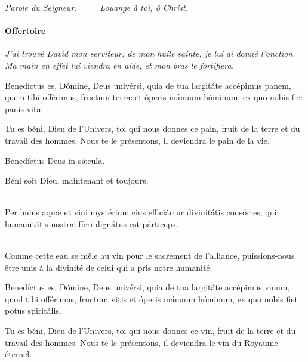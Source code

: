 \documentclass[twoside]{article}
\begin{document}
\emph{\vv Parole du Seigneur. ~~~~ \rr Louange à toi, ô Christ.}

\paragraph{Offertoire}


\emph{J’ai trouvé David mon serviteur: de mon huile sainte, je lui ai donné l’onction. Ma main en effet lui viendra en aide, et mon bras le fortifiera.}

\begin{paracol}{2}
Benedíctus es, Dómine, Deus univérsi,
quia de tua largitáte accépimus panem,
quem tibi offérimus,
fructum terræ et óperis mánuum hóminum:
ex quo nobis fiet panis vitæ. 

\switchcolumn

Tu es béni, Dieu de l'Univers, toi qui nous donnes ce pain, fruit de la terre et du travail des hommes. Nous te le présentons, il deviendra le pain de la vie.

\switchcolumn*

Benedíctus Deus in sǽcula. 

\switchcolumn

Béni soit Dieu, maintenant et toujours.

\switchcolumn*

\\
Per huius aquæ et vini mystérium
eius efficiámur divinitátis consórtes,
qui humanitátis nostræ fíeri dignátus est párticeps.

\switchcolumn

~\\
Comme cette eau se mêle au vin pour le sacrement de l'alliance, 
puissions-nous être unis à la divinité
de celui qui a pris notre humanité.

\switchcolumn*

Benedíctus es, Dómine, Deus univérsi,
quia de tua largitáte accépimus vinum,
quod tibi offérimus,
fructum vitis et óperis mánuum hóminum,
ex quo nobis fiet potus spiritális.

\switchcolumn

Tu es béni, Dieu de l'Univers, toi qui nous donnes ce vin, fruit de la terre et du travail des hommes. Nous te le présentons, il deviendra le vin du Royaume éternel.

\switchcolumn*


\end{paracol}
\end{document}
